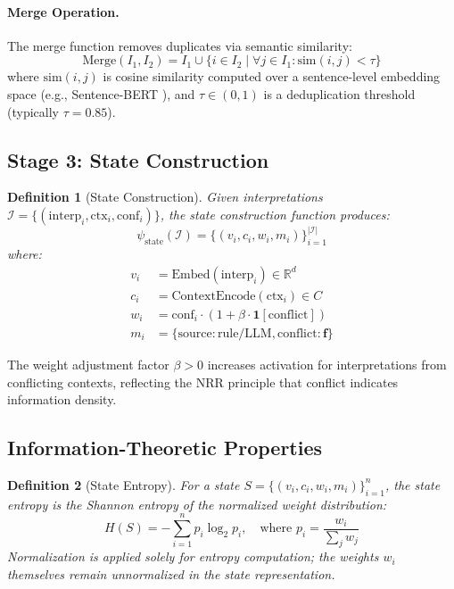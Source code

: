 \documentclass[11pt,a4paper]{article}
\newtheorem{definition}{Definition}
\begin{document}
\paragraph{Merge Operation.}
The merge function removes duplicates via semantic similarity:
\begin{equation}
\text{Merge}(I_1, I_2) = I_1 \cup \{i \in I_2 \mid \forall j \in I_1: \text{sim}(i,j) < \tau\}
\end{equation}
where $\text{sim}(i, j)$ is cosine similarity computed over a sentence-level 
embedding space (e.g., Sentence-BERT \cite{reimers2019sentencebert}), 
and $\tau \in (0,1)$ is a deduplication threshold (typically $\tau = 0.85$).

\subsection{Stage 3: State Construction}

\begin{definition}[State Construction]
Given interpretations $\mathcal{I} = \{(\text{interp}_i, \text{ctx}_i, \text{conf}_i)\}$, 
the state construction function produces:
\begin{equation}
\psi_{\text{state}}(\mathcal{I}) = \{(v_i, c_i, w_i, m_i)\}_{i=1}^{|\mathcal{I}|}
\end{equation}
where:
\begin{align}
v_i &= \text{Embed}(\text{interp}_i) \in \mathbb{R}^d \\
c_i &= \text{ContextEncode}(\text{ctx}_i) \in C \\
w_i &= \text{conf}_i \cdot (1 + \beta \cdot \mathbf{1}[\text{conflict}]) \\
m_i &= \{\text{source}: \text{rule/LLM}, \text{conflict}: \mathbf{f}\}
\end{align}
\end{definition}

The weight adjustment factor $\beta > 0$ increases activation for 
interpretations from conflicting contexts, reflecting the NRR principle 
that conflict indicates information density.

\subsection{Information-Theoretic Properties}

\begin{definition}[State Entropy]
For a state $S = \{(v_i, c_i, w_i, m_i)\}_{i=1}^{n}$, the \textit{state entropy} 
is the Shannon entropy of the normalized weight distribution:
\begin{equation}
H(S) = -\sum_{i=1}^{n} p_i \log_2 p_i, \quad \text{where } p_i = \frac{w_i}{\sum_j w_j}
\end{equation}
Normalization is applied solely for entropy computation; the weights $w_i$ 
themselves remain unnormalized in the state representation.
\end{definition}
\end{document}
